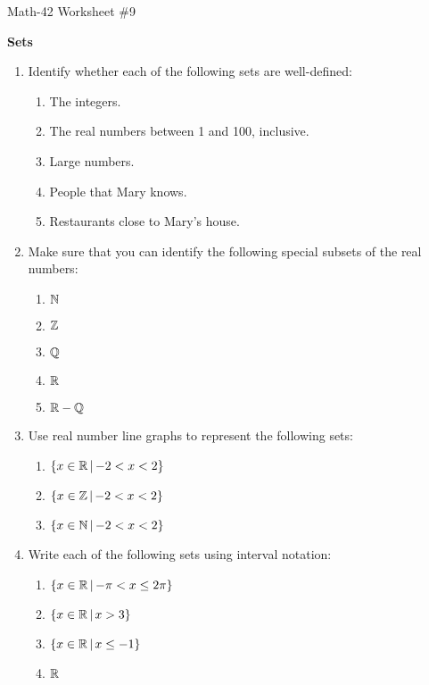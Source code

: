 \documentclass[letterpaper,12pt,fleqn]{article}
\begin{document}
\begin{center}
  \large Math-42 Worksheet \#9

  \textbf{Sets}
\end{center}

\vspace{0.5in}

\begin{enumerate}[left=0in,itemsep=0.5in]
\item Identify whether each of the following sets are well-defined:
  \begin{enumerate}
  \item The integers.
  \item The real numbers between 1 and 100, inclusive.
  \item Large numbers.
  \item People that Mary knows.
  \item Restaurants close to Mary's house.
  \end{enumerate}

\item Make sure that you can identify the following special subsets of the real numbers:
  \begin{enumerate}
  \item \(\mathbb{N}\)
  \item \(\mathbb{Z}\)
  \item \(\mathbb{Q}\)
  \item \(\mathbb{R}\)
  \item \(\mathbb{R}-\mathbb{Q}\)
  \end{enumerate}

\item Use real number line graphs to represent the following sets:
  \begin{enumerate}
  \item \(\left\{{x\in\mathbb{R}}\,\middle|\,{-2<x<2}\right\}\)
  \item \(\left\{{x\in\mathbb{Z}}\,\middle|\,{-2<x<2}\right\}\)
  \item \(\left\{{x\in\mathbb{N}}\,\middle|\,{-2<x<2}\right\}\)
  \end{enumerate}

\item Write each of the following sets using interval notation:
  \begin{enumerate}
  \item \(\left\{{x\in\mathbb{R}}\,\middle|\,{-\pi<x\le2\pi}\right\}\)
  \item \(\left\{{x\in\mathbb{R}}\,\middle|\,{x>3}\right\}\)
  \item \(\left\{{x\in\mathbb{R}}\,\middle|\,{x\le-1}\right\}\)
  \item \(\mathbb{R}\)
  \end{enumerate}


\end{enumerate}
\end{document}
